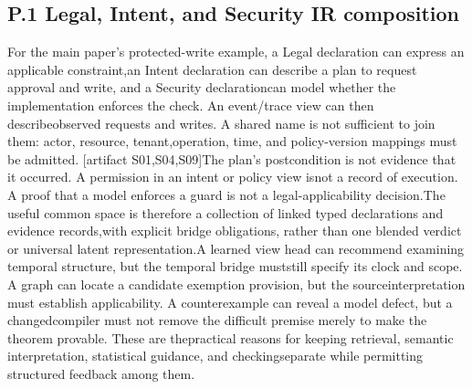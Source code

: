\subsection*{P.1  Legal, Intent, and Security IR composition}
\noindent
For the main paper's protected-write example, a Legal declaration can express an applicable constraint,\linebreak[4]
an Intent declaration can describe a plan to request approval and write, and a Security declaration\linebreak[4]
can model whether the implementation enforces the check. An event/trace view can then describe\linebreak[4]
observed requests and writes. A shared name is not sufficient to join them: actor, resource, tenant,\linebreak[4]
operation, time, and policy-version mappings must be admitted. [artifact S01,S04,S09]\linebreak[4]
The plan's postcondition is not evidence that it occurred. A permission in an intent or policy view is\linebreak[4]
not a record of execution. A proof that a model enforces a guard is not a legal-applicability decision.\linebreak[4]
The useful common space is therefore a collection of linked typed declarations and evidence records,\linebreak[4]
with explicit bridge obligations, rather than one blended verdict or universal latent representation.\linebreak[4]
A learned view head can recommend examining temporal structure, but the temporal bridge must\linebreak[4]
still specify its clock and scope. A graph can locate a candidate exemption provision, but the source\linebreak[4]
interpretation must establish applicability. A counterexample can reveal a model defect, but a changed\linebreak[4]
compiler must not remove the difficult premise merely to make the theorem provable. These are the\linebreak[4]
practical reasons for keeping retrieval, semantic interpretation, statistical guidance, and checking\linebreak[4]
separate while permitting structured feedback among them.\par

